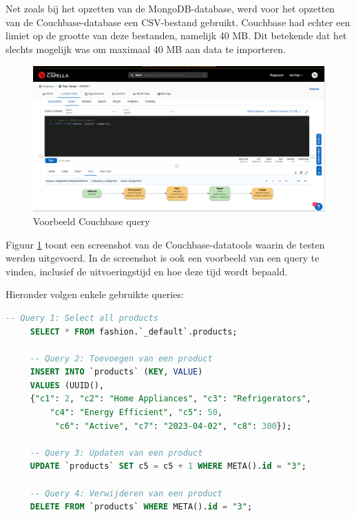 \newpage



\section{}%
\label{sec:test-couchbase}

\subsection{}%
\label{subsec:creating-couchbase}

Net zoals bij het opzetten van de MongoDB-database, werd voor het opzetten van de Couchbase-database een CSV-bestand gebruikt. Couchbase had echter een limiet op de grootte van deze bestanden, namelijk 40 MB. Dit betekende dat het slechts mogelijk was om maximaal 40 MB aan data te importeren.

\begin{figure}[H]
    \centering
    \includegraphics[width=\linewidth]{"graphics/Couchbase query"}
    \caption[Voorbeeld couchbase query]{Voorbeeld Couchbase query}
    \label{fig:couchbase-query}
\end{figure}

Figuur \ref{fig:couchbase-query} toont een screenshot van de Couchbase-datatools waarin de testen werden uitgevoerd. In de screenshot is ook een voorbeeld van een query te vinden, inclusief de uitvoeringstijd en hoe deze tijd wordt bepaald.

Hieronder volgen enkele gebruikte queries:

 \begin{lstlisting}[language=SQL, caption={Couchbase-queries voor het beheren van producten in de database.}]
     -- Query 1: Select all products
     SELECT * FROM fashion.`_default`.products;
     
     -- Query 2: Toevoegen van een product
     INSERT INTO `products` (KEY, VALUE)
     VALUES (UUID(), 
     {"c1": 2, "c2": "Home Appliances", "c3": "Refrigerators", 
         "c4": "Energy Efficient", "c5": 50,
          "c6": "Active", "c7": "2023-04-02", "c8": 300});
     
     -- Query 3: Updaten van een product
     UPDATE `products` SET c5 = c5 + 1 WHERE META().id = "3";
     
     -- Query 4: Verwijderen van een product
     DELETE FROM `products` WHERE META().id = "3";
 \end{lstlisting}


